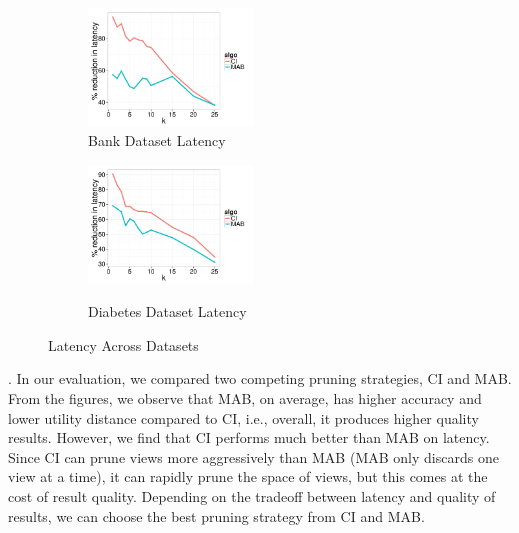 \begin{figure}[h]
	\centering
	\vspace*{-10pt}
	\begin{subfigure}{0.48\linewidth}
		\centering
		\includegraphics[width=4.4cm] {Images/in_memory_bank_latency.pdf}
		\vspace{-15pt}
		\caption{Bank Dataset Latency}
		\label{fig:bank_latency}
	\end{subfigure}
	\begin{subfigure}{0.48\linewidth}
		\centering
		\includegraphics[width=4.4cm] {Images/in_memory_dia_latency.pdf}\
		\vspace{-15pt}
		\caption{Diabetes Dataset Latency}
		\label{fig:dia_latency}
	\end{subfigure}
	\vspace{-10pt}
	\caption{Latency Across Datasets}
	\vspace{-10pt}
\end{figure}

.
In our evaluation, we compared two competing pruning strategies, CI and MAB. 
From the figures, we observe that MAB, 
on average, has higher accuracy and lower utility distance compared to
CI, i.e., overall, it produces higher quality results.
However, we find that CI performs much better than MAB on latency.
Since CI can prune views more aggressively than MAB (MAB only discards one view at a time),
it can rapidly prune the space of views, but this comes at the cost of result quality.
Depending on the tradeoff between latency and quality of results, we can choose the best
pruning strategy from CI and MAB.

